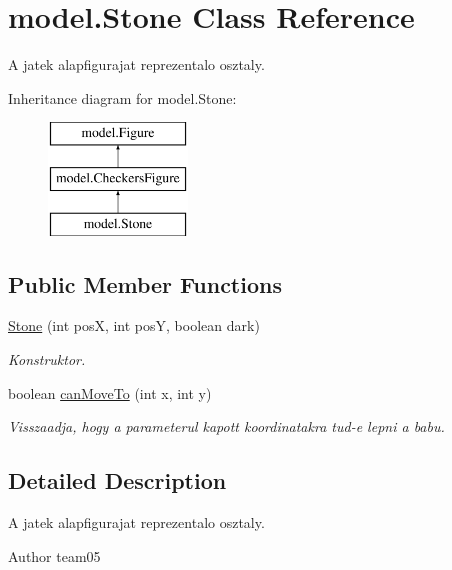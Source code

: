 \hypertarget{classmodel_1_1_stone}{}\section{model.\+Stone Class Reference}
\label{classmodel_1_1_stone}


A jatek alapfigurajat reprezentalo osztaly.  


Inheritance diagram for model.\+Stone\+:\begin{figure}[H]
\begin{center}
\leavevmode
\includegraphics[height=3.000000cm]{classmodel_1_1_stone}
\end{center}
\end{figure}
\subsection*{Public Member Functions}
\begin{DoxyCompactItemize}
\item 
\hyperlink{classmodel_1_1_stone_a73a42818e49280115f8eff4cf69a0d42}{Stone} (int pos\+X, int pos\+Y, boolean dark)
\begin{DoxyCompactList}\small\item\em Konstruktor. \end{DoxyCompactList}\item 
boolean \hyperlink{classmodel_1_1_stone_acf7437d0cba983b4f016c1d0f2decf1b}{can\+Move\+To} (int x, int y)
\begin{DoxyCompactList}\small\item\em Visszaadja, hogy a parameterul kapott koordinatakra tud-\/e lepni a babu. \end{DoxyCompactList}\end{DoxyCompactItemize}


\subsection{Detailed Description}
A jatek alapfigurajat reprezentalo osztaly. 

\begin{DoxyAuthor}{Author}
team05 
\end{DoxyAuthor}


